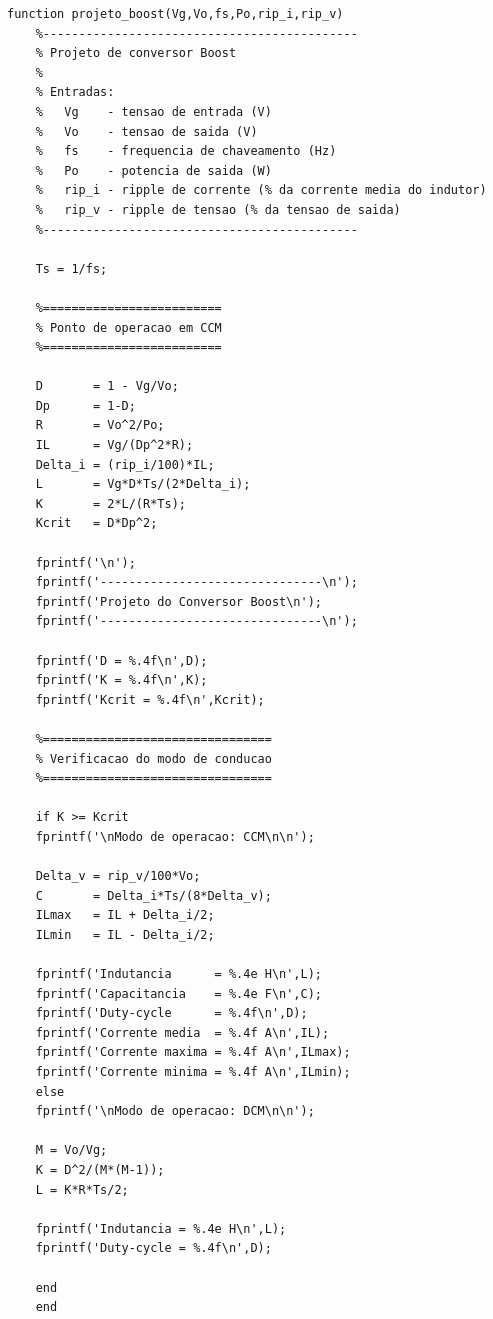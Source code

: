 \begin{lstlisting}[caption={Função que realiza o projeto do conversor Boost.},label={lst:item5}]
    function projeto_boost(Vg,Vo,fs,Po,rip_i,rip_v)
    %--------------------------------------------
    % Projeto de conversor Boost
    %
    % Entradas:
    %   Vg    - tensao de entrada (V)
    %   Vo    - tensao de saida (V)
    %   fs    - frequencia de chaveamento (Hz)
    %   Po    - potencia de saida (W)
    %   rip_i - ripple de corrente (% da corrente media do indutor)
    %   rip_v - ripple de tensao (% da tensao de saida)
    %--------------------------------------------
    
    Ts = 1/fs;
    
    %=========================
    % Ponto de operacao em CCM
    %=========================
    
    D       = 1 - Vg/Vo;
    Dp      = 1-D;
    R       = Vo^2/Po;
    IL      = Vg/(Dp^2*R);
    Delta_i = (rip_i/100)*IL;
    L       = Vg*D*Ts/(2*Delta_i);
    K       = 2*L/(R*Ts);
    Kcrit   = D*Dp^2;
    
    fprintf('\n');
    fprintf('-------------------------------\n');
    fprintf('Projeto do Conversor Boost\n');
    fprintf('-------------------------------\n');
    
    fprintf('D = %.4f\n',D);
    fprintf('K = %.4f\n',K);
    fprintf('Kcrit = %.4f\n',Kcrit);
    
    %================================
    % Verificacao do modo de conducao
    %================================
    
    if K >= Kcrit
    fprintf('\nModo de operacao: CCM\n\n');
    
    Delta_v = rip_v/100*Vo;
    C       = Delta_i*Ts/(8*Delta_v);
    ILmax   = IL + Delta_i/2;
    ILmin   = IL - Delta_i/2;
    
    fprintf('Indutancia      = %.4e H\n',L);
    fprintf('Capacitancia    = %.4e F\n',C);
    fprintf('Duty-cycle      = %.4f\n',D);
    fprintf('Corrente media  = %.4f A\n',IL);
    fprintf('Corrente maxima = %.4f A\n',ILmax);
    fprintf('Corrente minima = %.4f A\n',ILmin);
    else
    fprintf('\nModo de operacao: DCM\n\n');
    
    M = Vo/Vg;
    K = D^2/(M*(M-1));
    L = K*R*Ts/2;
    
    fprintf('Indutancia = %.4e H\n',L);
    fprintf('Duty-cycle = %.4f\n',D);
    
    end
    end
\end{lstlisting}

